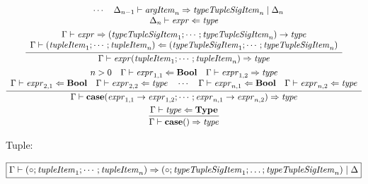 \begin{gather*}
{\begin{array}{c}
      \hspace{1em}
      \cdots
      \hspace{1em}
      \Delta_{n - 1} \vdash \mathit{argItem}_n \Rightarrow \mathit{typeTupleSigItem}_n \mid \Delta_n
      \\
      \Delta_n \vdash \mathit{expr} \Leftarrow \mathit{type}
    \end{array}
  }
  \\
  \infer{\Gamma \vdash \mathit{expr}(\mathit{tupleItem}_1; \cdots; \mathit{tupleItem}_n) \Rightarrow \mathit{type}}{
    \begin{array}{c}
      \Gamma \vdash \mathit{expr} \Rightarrow (\mathit{typeTupleSigItem}_1; \cdots; \mathit{typeTupleSigItem}_n) \rightarrow \mathit{type}
      \\
      \Gamma \vdash (\mathit{tupleItem}_1; \cdots; \mathit{tupleItem}_n) \Leftarrow (\mathit{typeTupleSigItem}_1; \cdots; \mathit{typeTupleSigItem}_n)
    \end{array}
  }
  \\
  \infer{\Gamma \vdash \mathbf{case}(\mathit{expr}_{1,1} \rightarrow \mathit{expr}_{1,2}; \cdots; \mathit{expr}_{n,1} \rightarrow \mathit{expr}_{n,2}) \Rightarrow \mathit{type}}{
    \begin{array}{c}
      n > 0
      \hspace{1em}
      \Gamma \vdash \mathit{expr}_{1, 1} \Leftarrow \mathbf{Bool}
      \hspace{1em}
      \Gamma \vdash \mathit{expr}_{1, 2} \Rightarrow \mathit{type}
      \\
      \Gamma \vdash \mathit{expr}_{2, 1} \Leftarrow \mathbf{Bool}
      \hspace{1em}
      \Gamma \vdash \mathit{expr}_{2, 2} \Leftarrow \mathit{type}
      \hspace{1em}
      \cdots
      \hspace{1em}
      \Gamma \vdash \mathit{expr}_{n, 1} \Leftarrow \mathbf{Bool}
      \hspace{1em}
      \Gamma \vdash \mathit{expr}_{n, 2} \Leftarrow \mathit{type}
    \end{array}
  }
  \\
  \infer{\Gamma \vdash \mathbf{case}() \Rightarrow \mathit{type}}{
    \Gamma \vdash \mathit{type} \Leftarrow \mathbf{Type}
  }
\end{gather*}

Tuple:

$\fbox{$\Gamma \vdash (\circ; \mathit{tupleItem}_1; \cdots; \mathit{tupleItem}_n) \Rightarrow (\circ; \mathit{typeTupleSigItem}_1; \ldots; \mathit{typeTupleSigItem}_n) \mid \Delta$}$

